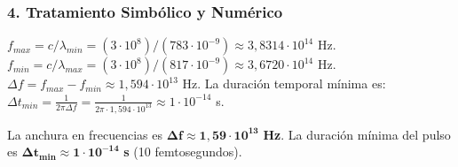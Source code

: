 \subsubsection*{4. Tratamiento Simbólico y Numérico}
$f_{max} = c/\lambda_{min} = (3\cdot10^8)/(783\cdot10^{-9}) \approx 3,8314 \cdot 10^{14}$ Hz.
$f_{min} = c/\lambda_{max} = (3\cdot10^8)/(817\cdot10^{-9}) \approx 3,6720 \cdot 10^{14}$ Hz.
$\Delta f = f_{max} - f_{min} \approx 1,594 \cdot 10^{13}$ Hz.
La duración temporal mínima es:
$\Delta t_{min} = \frac{1}{2\pi \Delta f} = \frac{1}{2\pi \cdot 1,594 \cdot 10^{13}} \approx 1 \cdot 10^{-14}$ s.
\begin{cajaresultado}
La anchura en frecuencias es $\boldsymbol{\Delta f \approx 1,59 \cdot 10^{13}}$ \textbf{Hz}. La duración mínima del pulso es $\boldsymbol{\Delta t_{min} \approx 1 \cdot 10^{-14}}$ \textbf{s} (10 femtosegundos).
\end{cajaresultado}

\newpage
